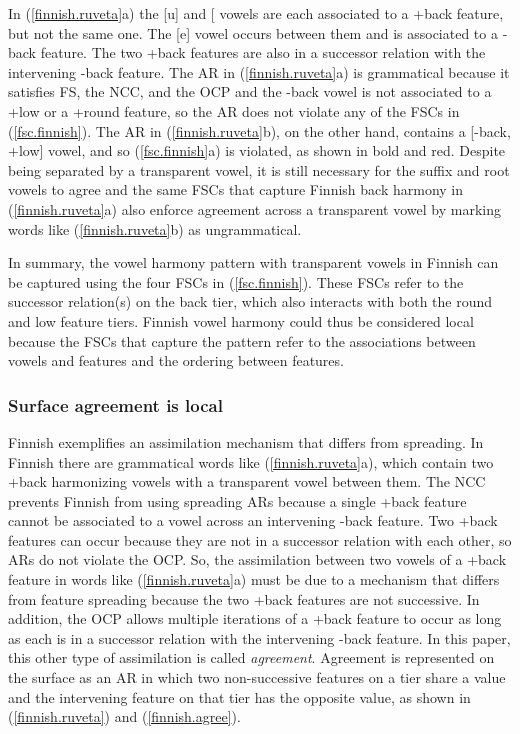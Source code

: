 \documentclass[,doc,floatsintext]{apa6}
\theoremstyle{definition}
\theoremstyle{definition}
\theoremstyle{definition}
\theoremstyle{remark}
\begin{document}
In (\ref{finnish.ruveta}a) the {[}u{]} and {[}\textipa{A}{]} vowels are
each associated to a +back feature, but not the same one. The {[}e{]}
vowel occurs between them and is associated to a -back feature. The two
+back features are also in a successor relation with the intervening
-back feature. The AR in (\ref{finnish.ruveta}a) is grammatical because
it satisfies FS, the NCC, and the OCP and the -back vowel is not
associated to a +low or a +round feature, so the AR does not violate any
of the FSCs in (\ref{fsc.finnish}). The AR in (\ref{finnish.ruveta}b),
on the other hand, contains a {[}-back, +low{]} vowel, and so
(\ref{fsc.finnish}a) is violated, as shown in bold and red. Despite
being separated by a transparent vowel, it is still necessary for the
suffix and root vowels to agree and the same FSCs that capture Finnish
back harmony in (\ref{finnish.ruveta}a) also enforce agreement across a
transparent vowel by marking words like (\ref{finnish.ruveta}b) as
ungrammatical.

In summary, the vowel harmony pattern with transparent vowels in Finnish
can be captured using the four FSCs in (\ref{fsc.finnish}). These FSCs
refer to the successor relation(s) on the back tier, which also
interacts with both the round and low feature tiers. Finnish vowel
harmony could thus be considered local because the FSCs that capture the
pattern refer to the associations between vowels and features and the
ordering between features.

\subsubsection{Surface agreement is
local}\label{surface-agreement-is-local}

Finnish exemplifies an assimilation mechanism that differs from
spreading. In Finnish there are grammatical words like
(\ref{finnish.ruveta}a), which contain two +back harmonizing vowels with
a transparent vowel between them. The NCC prevents Finnish from using
spreading ARs because a single +back feature cannot be associated to a
vowel across an intervening -back feature. Two +back features can occur
because they are not in a successor relation with each other, so ARs do
not violate the OCP. So, the assimilation between two vowels of a +back
feature in words like (\ref{finnish.ruveta}a) must be due to a mechanism
that differs from feature spreading because the two +back features are
not successive. In addition, the OCP allows multiple iterations of a
+back feature to occur as long as each is in a successor relation with
the intervening -back feature. In this paper, this other type of
assimilation is called \emph{agreement}. Agreement is represented on the
surface as an AR in which two non-successive features on a tier share a
value and the intervening feature on that tier has the opposite value,
as shown in (\ref{finnish.ruveta}) and (\ref{finnish.agree}).
\end{document}
